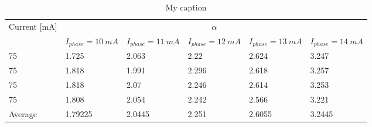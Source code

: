 \begin{table}[!htb]
    \centering
    \caption{My caption}
    \label{my-label}
    \begin{tabular}{@{}llllll@{}}
    \toprule
    \multirow{2}{*}{Current {[}mA{]}} & \multicolumn{5}{c}{$\alpha$}                                                                                \\ \cmidrule(l){2-6} 
                                      & $I_{phase}=10 \ mA$ & $I_{phase}=11 \ mA$ & $I_{phase}=12 \ mA$ & $I_{phase}=13 \ mA$ & $I_{phase}=14 \ mA$ \\ \midrule
    75                                & 1.725               & 2.063               & 2.22                & 2.624               & 3.247               \\
    75                                & 1.818               & 1.991               & 2.296               & 2.618               & 3.257               \\
    75                                & 1.818               & 2.07                & 2.246               & 2.614               & 3.253               \\
    75                                & 1.808               & 2.054               & 2.242               & 2.566               & 3.221               \\ \midrule
    Average                           & 1.79225             & 2.0445              & 2.251               & 2.6055              & 3.2445              \\ \bottomrule
    \end{tabular}
\end{table}